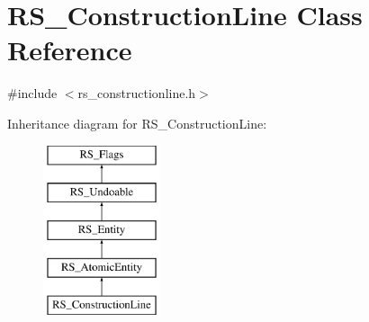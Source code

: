 \hypertarget{classRS__ConstructionLine}{\section{R\-S\-\_\-\-Construction\-Line Class Reference}
\label{classRS__ConstructionLine}
}


{\ttfamily \#include $<$rs\-\_\-constructionline.\-h$>$}

Inheritance diagram for R\-S\-\_\-\-Construction\-Line\-:\begin{figure}[H]
\begin{center}
\leavevmode
\includegraphics[height=5.000000cm]{classRS__ConstructionLine}
\end{center}
\end{figure}
